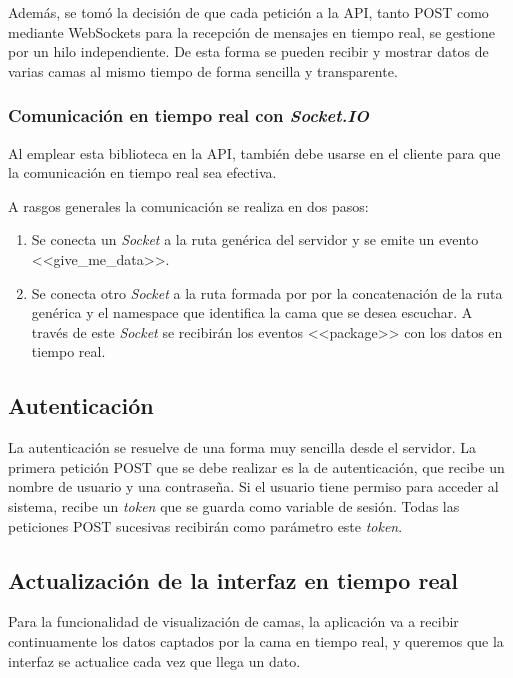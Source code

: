 Además, se tomó la decisión de que cada petición a la API, tanto POST como mediante WebSockets para la recepción de mensajes en tiempo real, se gestione por un hilo independiente. De esta forma se pueden recibir y mostrar datos de varias camas al mismo tiempo de forma sencilla y transparente. 

\subsubsection{Comunicación en tiempo real con \textit{Socket.IO}}

Al emplear esta biblioteca en la API, también debe usarse en el cliente para que la comunicación en tiempo real sea efectiva. 

A rasgos generales la comunicación se realiza en dos pasos: 

\begin{enumerate}
	\item Se conecta un \textit{Socket} a la ruta genérica del servidor y se emite un evento <<give\_me\_data>>. 
	\item Se conecta otro \textit{Socket} a la ruta formada por por la concatenación de la ruta genérica y el namespace que identifica la cama que se desea escuchar. A través de este \textit{Socket} se recibirán los eventos <<package>> con los datos en tiempo real. 
\end{enumerate}

\subsection{Autenticación}

La autenticación se resuelve de una forma muy sencilla desde el servidor. La primera petición POST que se debe realizar es la de autenticación, que recibe un nombre de usuario y una contraseña. Si el usuario tiene permiso para acceder al sistema, recibe un \textit{token} que se guarda como variable de sesión. Todas las peticiones POST sucesivas recibirán como parámetro este \textit{token}. 

\subsection{Actualización de la interfaz en tiempo real}

Para la funcionalidad de visualización de camas, la aplicación va a recibir continuamente los datos captados por la cama en tiempo real, y queremos que la interfaz se actualice cada vez que llega un dato. 

